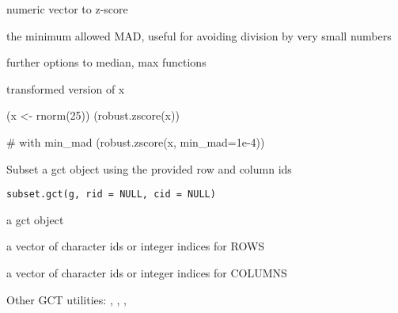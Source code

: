 \documentclass[letterpaper]{book}
\begin{document}
%
\begin{Arguments}
\begin{ldescription}
\item[\code{x}] numeric vector to z-score

\item[\code{min\_mad}] the minimum allowed MAD,
useful for avoiding division by very
small numbers

\item[\code{...}] further options to median, max functions
\end{ldescription}
\end{Arguments}
%
\begin{Value}
transformed version of x
\end{Value}
%
\begin{Examples}
\begin{ExampleCode}
(x <- rnorm(25))
(robust.zscore(x))

# with min_mad
(robust.zscore(x, min_mad=1e-4))

\end{ExampleCode}
\end{Examples}
%
\begin{Description}\relax
Subset a gct object using the provided row and column ids
\end{Description}
%
\begin{Usage}
\begin{verbatim}
subset.gct(g, rid = NULL, cid = NULL)
\end{verbatim}
\end{Usage}
%
\begin{Arguments}
\begin{ldescription}
\item[\code{g}] a gct object

\item[\code{rid}] a vector of character ids or integer indices for ROWS

\item[\code{cid}] a vector of character ids or integer indices for COLUMNS
\end{ldescription}
\end{Arguments}
%
\begin{SeeAlso}\relax
Other GCT utilities: ,
, ,
\end{SeeAlso}
\end{document}
